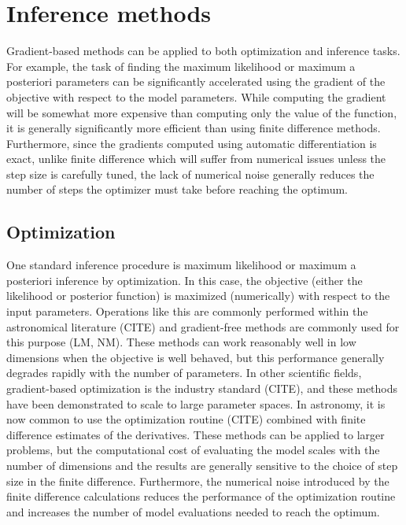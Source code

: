 \documentclass[modern]{aastex62}
\begin{document}
\section{Inference methods}

Gradient-based methods can be applied to both optimization and inference tasks.
For example, the task of finding the maximum likelihood or maximum a posteriori parameters can be significantly accelerated using the gradient of the objective with respect to the model parameters.
While computing the gradient will be somewhat more expensive than computing only the value of the function, it is generally significantly more efficient than using finite difference methods.
Furthermore, since the gradients computed using automatic differentiation is exact, unlike finite difference which will suffer from numerical issues unless the step size is carefully tuned, the lack of numerical noise generally reduces the number of steps the optimizer must take before reaching the optimum.

\subsection{Optimization}

One standard inference procedure is maximum likelihood or maximum a posteriori inference by optimization.
In this case, the objective (either the likelihood or posterior function) is maximized (numerically) with respect to the input parameters.
Operations like this are commonly performed within the astronomical literature (CITE) and gradient-free methods are commonly used for this purpose (LM, NM).
These methods can work reasonably well in low dimensions when the objective is well behaved, but this performance generally degrades rapidly with the number of parameters.
In other scientific fields, gradient-based optimization is the industry standard (CITE), and these methods have been demonstrated to scale to large parameter spaces.
In astronomy, it is now common to use the  optimization routine (CITE) combined with finite difference estimates of the derivatives.
These methods can be applied to larger problems, but the computational cost of evaluating the model scales with the number of dimensions and the results are generally sensitive to the choice of step size in the finite difference.
Furthermore, the numerical noise introduced by the finite difference calculations reduces the performance of the optimization routine and increases the number of model evaluations needed to reach the optimum.
\end{document}
